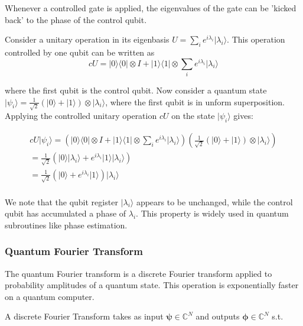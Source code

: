 \documentclass{article}
\begin{document}
Whenever a controlled gate is applied, the eigenvalues of the gate can be 'kicked back' to the phase of the control qubit.

Consider a unitary operation in its eigenbasis $U = \sum_i e^{i \lambda_i} \lvert \lambda _i \rangle $. This operation controlled by one qubit can be written as
\begin{equation}
cU = \lvert 0 \rangle \langle 0 \rvert \otimes I +  \lvert 1 \rangle \langle 1 \rvert \otimes  \sum_i e^{i \lambda_i}\lvert \lambda _i \rangle
\end{equation}

where the first qubit is the control qubit. Now consider a quantum state $\lvert \psi_i \rangle = \frac{1}{\sqrt{2}}(\lvert 0 \rangle + \lvert 1 \rangle)\otimes \lvert \lambda_i \rangle$, where the first qubit is in unform superposition. Applying the controlled unitary operation $cU$ on the state $\lvert \psi_i \rangle$ gives:

\begin{multline}
cU \lvert \psi_i \rangle  = ( \lvert 0 \rangle \langle 0 \rvert \otimes I +  \lvert 1 \rangle \langle 1 \rvert \otimes  \sum_i e^{i \lambda_i} \lvert \lambda _i \rangle ) ( \frac{1}{\sqrt{2}}(\lvert 0 \rangle + \lvert 1 \rangle)\otimes \lvert \lambda_i \rangle)
\\
= \frac{1}{\sqrt{2}} (  \lvert 0 \rangle \lvert \lambda_i \rangle + e^{i \lambda_i} \lvert 1 \rangle \lvert \lambda_i \rangle  )
\\
= \frac{1}{\sqrt{2}} (  \lvert 0 \rangle + e^{i \lambda_i} \lvert 1 \rangle ) \lvert \lambda_i \rangle 
\\
\end{multline}

We note that the qubit register $ \lvert \lambda_i \rangle $ appears to be unchanged, while the control qubit has accumulated a phase of $ \lambda_i$. This property is widely used in quantum subroutines like phase estimation.






\subsubsection{Quantum Fourier Transform}

The quantum Fourier transform is a discrete Fourier transform applied to probability amplitudes of a quantum state. This operation is exponentially faster on a quantum computer.

A discrete Fourier Transform takes as input $ \mathbf{\psi} \in \mathbb{C}^N $ and outputs $ \mathbf{\phi} \in \mathbb{C}^N $ s.t.
\end{document}
